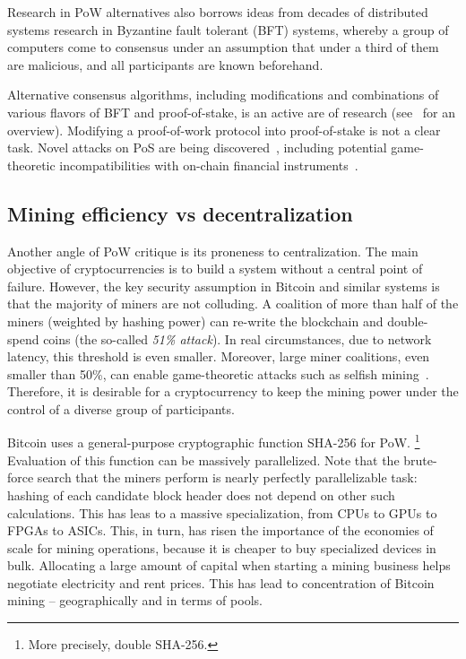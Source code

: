 Research in PoW alternatives also borrows ideas from decades of distributed systems research in Byzantine fault tolerant (BFT) systems, whereby a group of computers come to consensus under an assumption that under a third of them are malicious, and all participants are known beforehand.

Alternative consensus algorithms, including modifications and combinations of various flavors of BFT and proof-of-stake, is an active are of research (see~\cite{Bano2019} for an overview).
Modifying a proof-of-work protocol into proof-of-stake is not a clear task.
Novel attacks on PoS are being discovered~\cite{Fanti2019,Gazi2018,BrownCohen2019}, including potential game-theoretic incompatibilities with on-chain financial instruments~\cite{Chitra2020}.


\subsection{Mining efficiency vs decentralization}

Another angle of PoW critique is its proneness to centralization.
The main objective of cryptocurrencies is to build a system without a central point of failure.
However, the key security assumption in Bitcoin and similar systems is that the majority of miners are not colluding.
A coalition of more than half of the miners (weighted by hashing power) can re-write the blockchain and double-spend coins (the so-called \textit{51\% attack}).
In real circumstances, due to network latency, this threshold is even smaller.
Moreover, large miner coalitions, even smaller than 50\%, can enable game-theoretic attacks such as selfish mining~\cite{Eyal2018}.
Therefore, it is desirable for a cryptocurrency to keep the mining power under the control of a diverse group of participants.

Bitcoin uses a general-purpose cryptographic function SHA-256 for PoW.
\footnote{More precisely, double SHA-256.}
Evaluation of this function can be massively parallelized.
Note that the brute-force search that the miners perform is nearly perfectly parallelizable task: hashing of each candidate block header does not depend on other such calculations.
This has leas to a massive specialization, from CPUs to GPUs to FPGAs to ASICs.
This, in turn, has risen the importance of the economies of scale for mining operations, because it is cheaper to buy specialized devices in bulk.
Allocating a large amount of capital when starting a mining business helps negotiate electricity and rent prices.
This has lead to concentration of Bitcoin mining -- geographically and in terms of pools.


